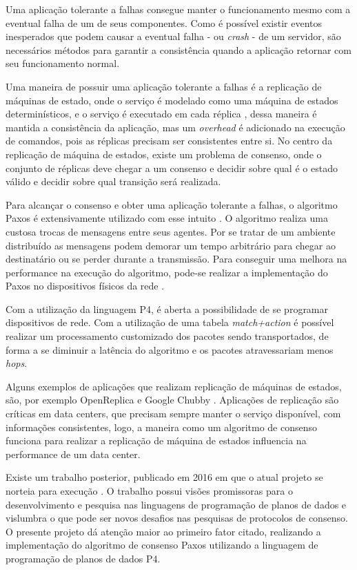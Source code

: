\documentclass[12pt,
openright, 
oneside,
a4paper,
brazil]{facom-ufu-abntex2}
\theoremstyle{definition}
\begin{document}
Uma aplicação tolerante a falhas consegue manter o funcionamento mesmo com a eventual 
falha de um de seus componentes. Como é possível existir eventos inesperados que podem
causar a eventual falha - ou \textit{crash} - de um servidor, são necessários métodos
para garantir a consistência quando a aplicação retornar com seu funcionamento
normal. 

Uma maneira de possuir uma aplicação tolerante a falhas é a replicação de máquinas
de estado, onde o serviço é modelado como uma máquina de estados determinísticos, e o
serviço é executado em cada réplica \citep{santos2012state}, dessa maneira é mantida
a consistência da aplicação, mas um \textit{overhead} é adicionado na execução
de comandos, pois as réplicas precisam ser consistentes entre si. No centro da replicação
de máquina de estados, existe um problema de consenso, onde o conjunto de réplicas deve 
chegar a um consenso e decidir sobre qual é o estado válido e decidir sobre qual 
transição será realizada. 

Para alcançar o consenso e obter uma aplicação tolerante a falhas, o algoritmo
Paxos é extensivamente utilizado com esse intuito \citep{dang2016paxos}. 
O algoritmo realiza uma custosa trocas de mensagens entre seus agentes. Por se 
tratar de um ambiente distribuído as mensagens podem demorar um tempo arbitrário 
para chegar ao destinatário ou se perder durante a transmissão. Para conseguir 
uma melhora na performance na execução do algoritmo, pode-se realizar a 
implementação do Paxos no dispositivos físicos da rede \citep{dang2016paxos}.

Com a utilização da linguagem P4, é aberta a possibilidade de se programar dispositivos
de rede. Com a utilização de uma tabela \textit{match+action} é possível 
realizar um processamento customizado dos pacotes sendo transportados, de forma a
se diminuir a latência do algoritmo e os pacotes atravessariam menos \textit{hops}.

Alguns exemplos de aplicações que realizam replicação de máquinas de estados, são,
por exemplo OpenReplica \citep{openreplica} e Google Chubby \citep{27897}. Aplicações
de replicação são críticas em data centers, que precisam sempre manter o serviço 
disponível, com informações consistentes, logo, a maneira como um algoritmo de consenso
funciona para realizar a replicação de máquina de estados influencia na performance 
de um data center.

Existe um trabalho posterior, publicado em 2016 em que o atual projeto se norteia para
execução \citep{dang2016paxos}. O trabalho possui visões promissoras para o desenvolvimento
e pesquisa nas linguagens de programação de planos de dados e vislumbra o que pode ser
novos desafios nas pesquisas de protocolos de consenso. O presente projeto dá atenção maior
ao primeiro fator citado, realizando a implementação do algoritmo de consenso Paxos utilizando
a linguagem de programação de planos de dados P4.
\end{document}
